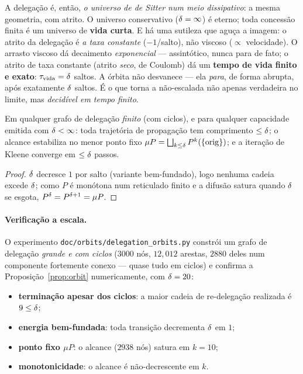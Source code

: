 \begin{remark}\label{rem:vida}
A delegação é, então, \emph{o universo de de Sitter num meio dissipativo}: a
mesma geometria, com atrito. O universo conservativo ($\delta=\infty$) é eterno;
toda concessão finita é um universo de \textbf{vida curta}. E há uma sutileza
que aguça a imagem: o atrito da delegação é \emph{a taxa constante}
($-1$/salto), não viscoso ($\propto$ velocidade). O arrasto viscoso dá decaimento
\emph{exponencial} --- assintótico, nunca para de fato; o atrito de taxa
constante (atrito \emph{seco}, de Coulomb) dá um \textbf{tempo de vida finito e
exato}: $\tau_{\mathrm{vida}}=\delta$ saltos. A órbita não desvanece --- ela
\emph{para}, de forma abrupta, após exatamente $\delta$ saltos. É o que torna a
não-escalada não apenas verdadeira no limite, mas \emph{decidível em tempo
finito}.
\end{remark}

\begin{proposition}\label{prop:orbit}
Em qualquer grafo de delegação \emph{finito} (com ciclos), e para qualquer
capacidade emitida com $\delta<\infty$: toda trajetória de propagação tem
comprimento $\le\delta$; o alcance estabiliza no menor ponto fixo
$\mu P=\bigsqcup_{k\le\delta}P^k(\{\mathrm{orig}\})$; e a iteração de Kleene
converge em $\le\delta$ passos.
\end{proposition}
\begin{proof}
$\delta$ decresce $1$ por salto (variante bem-fundado), logo nenhuma cadeia
excede $\delta$; como $P$ é monótona num reticulado finito e a difusão satura
quando $\delta$ se esgota, $P^{\delta}=P^{\delta+1}=\mu P$.
\end{proof}

\paragraph{Verificação a escala.} O experimento
\texttt{doc/orbits/delegation\_orbits.py} constrói um grafo de delegação
\emph{grande e com ciclos} ($3000$ nós, $12{,}012$ arestas, $2880$ deles num
componente fortemente conexo --- quase tudo em ciclos) e confirma a
Proposição~\ref{prop:orbit} numericamente, com $\delta=20$:
\begin{itemize}[nosep,leftmargin=1.3em]
  \item \textbf{terminação apesar dos ciclos}: a maior cadeia de re-delegação
        realizada é $9\le\delta$;
  \item \textbf{energia bem-fundada}: toda transição decrementa $\delta$ em $1$;
  \item \textbf{ponto fixo $\mu P$}: o alcance ($2938$ nós) satura em $k=10$;
  \item \textbf{monotonicidade}: o alcance é não-decrescente em $k$.
\end{itemize}

